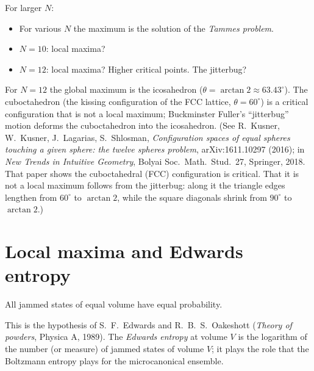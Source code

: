 For larger $N$:
\begin{itemize}
\item For various $N$ the maximum is the solution of the \emph{Tammes problem}. 
\item $N=10$: local maxima? 
\item $N=12$: local maxima? Higher critical points. The jitterbug?
\end{itemize}
\begin{addedblock}
For $N=12$ the global maximum is the icosahedron ($\theta=\arctan 2\approx63.43^\circ$). The cuboctahedron (the kissing configuration of the FCC lattice, $\theta=60^\circ$) is a critical configuration that is not a local maximum; Buckminster Fuller's ``jitterbug'' motion deforms the cuboctahedron into the icosahedron. (See R.~Kusner, W.~Kusner, J.~Lagarias, S.~Shlosman, \emph{Configuration spaces of equal spheres touching a given sphere: the twelve spheres problem}, arXiv:1611.10297 (2016); in \emph{New Trends in Intuitive Geometry}, Bolyai Soc.\ Math.\ Stud.\ 27, Springer, 2018. That paper shows the cuboctahedral (FCC) configuration is critical. That it is not a local maximum follows from the jitterbug: along it the triangle edges lengthen from $60^\circ$ to $\arctan 2$, while the square diagonals shrink from $90^\circ$ to $\arctan 2$.)
\end{addedblock}

\section{Local maxima and Edwards entropy}
\label{L11:sec:edwards}

\begin{definition}\label{L11:def:edwards}
All jammed states of equal volume have equal probability.
\end{definition}
\begin{addedblock}
This is the hypothesis of S.~F.~Edwards and R.~B.~S.~Oakeshott (\emph{Theory of powders}, Physica A, 1989). The \emph{Edwards entropy} at volume $V$ is the logarithm of the number (or measure) of jammed states of volume $V$; it plays the role that the Boltzmann entropy plays for the microcanonical ensemble.
\end{addedblock}


